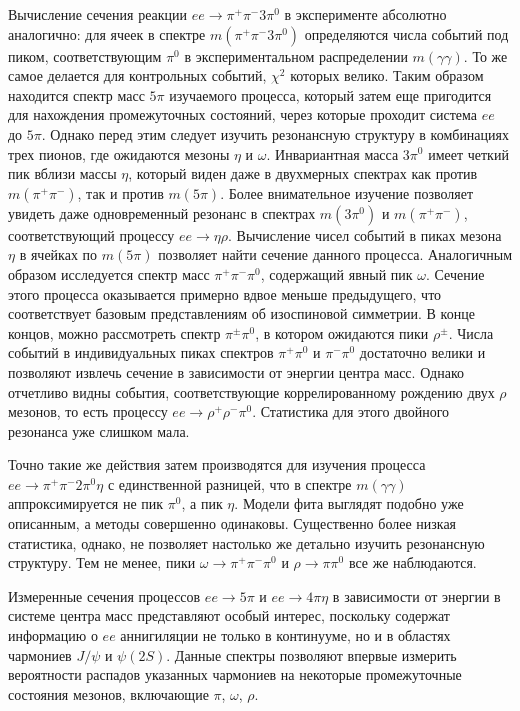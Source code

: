 \documentclass[a4paper, 12pt]{article}
\def\pip{\pi^+}
\def\pim{\pi^-}
\def\piz{\pi^0}
\def\rhop{\rho^+}
\def\rhom{\rho^-}
\begin{document}
Вычисление сечения реакции $ee\to\pip\pim3\piz$ в эксперименте абсолютно 
аналогично: для ячеек в спектре $m(\pip\pim3\piz)$ определяются числа 
событий под пиком, соответствующим $\piz$ в экспериментальном 
распределении $m(\gamma\gamma)$. То же самое делается для контрольных 
событий, $\chi^2$ которых велико. Таким образом находится спектр масс 
$5\pi$ изучаемого процесса, который затем еще пригодится для нахождения 
промежуточных состояний, через которые проходит система $ee$ до $5\pi$.
%
Однако перед этим следует изучить резонансную структуру в комбинациях 
трех пионов, где ожидаются мезоны $\eta$ и $\omega$. Инвариантная масса 
$3\piz$ имеет четкий пик вблизи массы $\eta$, который виден даже 
в двухмерных спектрах как против $m(\pip\pim)$, так и против $m(5\pi)$. 
Более внимательное изучение позволяет увидеть даже одновременный 
резонанс в спектрах $m(3\piz)$ и $m(\pip\pim)$, соответствующий процессу 
$ee\to\eta\rho$. Вычисление чисел событий в пиках мезона $\eta$ 
в ячейках по $m(5\pi)$ позволяет найти сечение данного процесса.
%
Аналогичным образом исследуется спектр масс $\pip\pim\piz$, содержащий 
явный пик $\omega$. Сечение этого процесса оказывается примерно вдвое 
меньше предыдущего, что соответствует базовым представлениям об 
изоспиновой симметрии.
%
В конце концов, можно рассмотреть спектр $\pi^\pm\piz$, в котором 
ожидаются пики $\rho^\pm$. Числа событий в индивидуальных пиках спектров 
$\pip\piz$ и $\pim\piz$ достаточно велики и позволяют извлечь сечение 
в зависимости от энергии центра масс. Однако отчетливо видны события, 
соответствующие коррелированному рождению двух $\rho$ мезонов, то есть 
процессу $ee\to\rhop\rhom\piz$. Статистика для этого двойного резонанса 
уже слишком мала.

Точно такие же действия затем производятся для изучения процесса 
$ee\to\pip\pim2\piz\eta$ с единственной разницей, что в спектре 
$m(\gamma\gamma)$ аппроксимируется не пик $\piz$, а пик $\eta$. Модели 
фита выглядят подобно уже описанным, а методы совершенно одинаковы. 
Существенно более низкая статистика, однако, не позволяет настолько же 
детально изучить резонансную структуру. Тем не менее, пики 
$\omega\to\pip\pim\piz$ и $\rho\to\pi\piz$ все же наблюдаются.

Измеренные сечения процессов $ee\to5\pi$ и $ee\to4\pi\eta$ в зависимости 
от энергии в системе центра масс представляют особый интерес, поскольку 
содержат информацию о $ee$ аннигиляции не только в континууме, но 
и в областях чармониев $J/\psi$ и $\psi(2S)$. Данные спектры позволяют 
впервые измерить вероятности распадов указанных чармониев на некоторые 
промежуточные состояния мезонов, включающие $\pi$, $\omega$, $\rho$.
\end{document}

